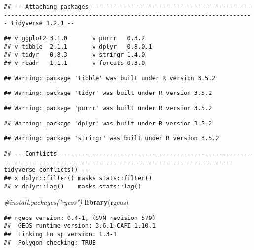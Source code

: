 \documentclass[]{article}
\newenvironment{Shaded}{\begin{snugshade}}{\end{snugshade}}
\newcommand{\KeywordTok}[1]{\textcolor[rgb]{0.13,0.29,0.53}{\textbf{#1}}}
\newcommand{\CommentTok}[1]{\textcolor[rgb]{0.56,0.35,0.01}{\textit{#1}}}
\newcommand{\NormalTok}[1]{#1}
\begin{document}
\begin{verbatim}
## -- Attaching packages -------------------------------------------------------------------------------------------------------------------- tidyverse 1.2.1 --
\end{verbatim}

\begin{verbatim}
## v ggplot2 3.1.0       v purrr   0.3.2  
## v tibble  2.1.1       v dplyr   0.8.0.1
## v tidyr   0.8.3       v stringr 1.4.0  
## v readr   1.1.1       v forcats 0.3.0
\end{verbatim}

\begin{verbatim}
## Warning: package 'tibble' was built under R version 3.5.2
\end{verbatim}

\begin{verbatim}
## Warning: package 'tidyr' was built under R version 3.5.2
\end{verbatim}

\begin{verbatim}
## Warning: package 'purrr' was built under R version 3.5.2
\end{verbatim}

\begin{verbatim}
## Warning: package 'dplyr' was built under R version 3.5.2
\end{verbatim}

\begin{verbatim}
## Warning: package 'stringr' was built under R version 3.5.2
\end{verbatim}

\begin{verbatim}
## -- Conflicts ----------------------------------------------------------------------------------------------------------------------- tidyverse_conflicts() --
## x dplyr::filter() masks stats::filter()
## x dplyr::lag()    masks stats::lag()
\end{verbatim}

\begin{Shaded}
\begin{Highlighting}[]
  \CommentTok{#install.packages("rgeos")  }
    \KeywordTok{library}\NormalTok{(rgeos)}
\end{Highlighting}
\end{Shaded}

\begin{verbatim}
## rgeos version: 0.4-1, (SVN revision 579)
##  GEOS runtime version: 3.6.1-CAPI-1.10.1 
##  Linking to sp version: 1.3-1 
##  Polygon checking: TRUE
\end{verbatim}
\end{document}
